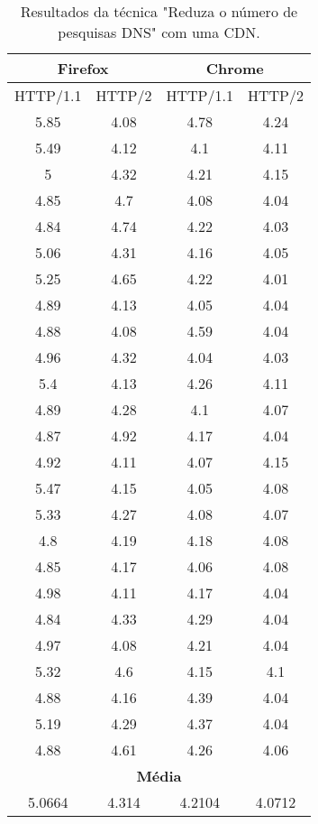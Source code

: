 \begin{table}[h]
	\centering
	\caption{Resultados da técnica "Reduza o número de pesquisas DNS" com uma CDN.}
	\label{resultados-reduzaonumerodepesquisasdns-unica}
	\begin{tabular}{cccc}
		\hline
		\multicolumn{2}{c}{\textbf{Firefox}} & \multicolumn{2}{c}{\textbf{Chrome}} \\
		\hline
		HTTP/1.1 & HTTP/2 & HTTP/1.1 & HTTP/2 \\
		\hline
		5.85 & 4.08 & 4.78 & 4.24 \\
		5.49 & 4.12 & 4.1 & 4.11 \\
		5 & 4.32 & 4.21 & 4.15 \\
		4.85 & 4.7 & 4.08 & 4.04 \\
		4.84 & 4.74 & 4.22 & 4.03 \\
		5.06 & 4.31 & 4.16 & 4.05 \\
		5.25 & 4.65 & 4.22 & 4.01 \\
		4.89 & 4.13 & 4.05 & 4.04 \\
		4.88 & 4.08 & 4.59 & 4.04 \\
		4.96 & 4.32 & 4.04 & 4.03 \\
		5.4 & 4.13 & 4.26 & 4.11 \\
		4.89 & 4.28 & 4.1 & 4.07 \\
		4.87 & 4.92 & 4.17 & 4.04 \\
		4.92 & 4.11 & 4.07 & 4.15 \\
		5.47 & 4.15 & 4.05 & 4.08 \\
		5.33 & 4.27 & 4.08 & 4.07 \\
		4.8 & 4.19 & 4.18 & 4.08 \\ 
		4.85 & 4.17 & 4.06 & 4.08 \\
		4.98 & 4.11 & 4.17 & 4.04 \\
		4.84 & 4.33 & 4.29 & 4.04 \\
		4.97 & 4.08 & 4.21 & 4.04 \\
		5.32 & 4.6 & 4.15 & 4.1 \\
		4.88 & 4.16 & 4.39 & 4.04 \\
		5.19 & 4.29 & 4.37 & 4.04 \\
		4.88 & 4.61 & 4.26 & 4.06 \\
		\hline
		\multicolumn{4}{c}{\textbf{Média}} \\
		5.0664 & 4.314 & 4.2104 & 4.0712 \\
		\hline
	\end{tabular}
\end{table}